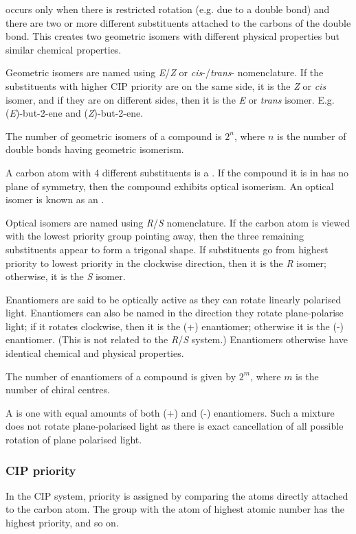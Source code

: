 \documentclass[Chemistry.tex]{subfiles}
\begin{document}
 occurs only when there is restricted rotation (e.g. due to a  double bond) and there are two or more different substituents attached to the carbons of the double bond. This creates two geometric isomers with different physical properties but similar chemical properties.

Geometric isomers are named using \emph{E}/\emph{Z} or \emph{cis}-/\emph{trans}- nomenclature. If the substituents with higher CIP priority are on the same side, it is the \emph{Z} or \emph{cis} isomer, and if they are on different sides, then it is the \emph{E} or \emph{trans} isomer. E.g. (\emph{E})-but-2-ene and (\emph{Z})-but-2-ene.

The number of geometric isomers of a compound is \(2^n\), where \(n\) is the number of double bonds having geometric isomerism.

A carbon atom with 4 different substituents is a . If the compound it is in has no plane of symmetry, then the compound exhibits optical isomerism. An optical isomer is known as an .

Optical isomers are named using \emph{R}/\emph{S} nomenclature. If the carbon atom is viewed with the lowest priority group pointing away, then the three remaining substituents appear to form a trigonal shape. If substituents go from highest priority to lowest priority in the clockwise direction, then it is the \emph{R} isomer; otherwise, it is the \emph{S} isomer.

Enantiomers are said to be optically active as they can rotate linearly polarised light. Enantiomers can also be named in the direction they rotate plane-polarise light; if it rotates clockwise, then it is the (+) enantiomer; otherwise it is the (-) enantiomer. (This is not related to the \emph{R}/\emph{S} system.) Enantiomers otherwise have identical chemical and physical properties.

The number of enantiomers of a compound is given by \(2^m\), where \(m\) is the number of chiral centres.

A  is one with equal amounts of both (+) and (-) enantiomers. Such a mixture does not rotate plane-polarised light as there is exact cancellation of all possible rotation of plane polarised light.
\subsubsection{CIP priority}
In the CIP system, priority is assigned by comparing the atoms directly attached to the carbon atom. The group with the atom of highest atomic number has the highest priority, and so on.
\end{document}
